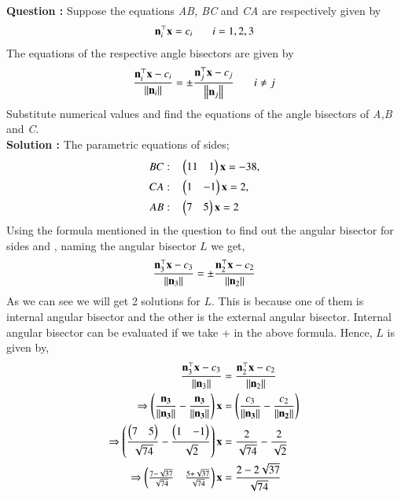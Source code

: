 \documentclass[journal,12pt,twocolumn]{IEEEtran}
\theoremstyle{remark}
\begin{document}
%

\textbf{Question :} Suppose the equations \textit{AB, BC} and \textit{CA} are respectively given by
		\begin{align}
			\vec{n}_{i}^{\top} \vec{x} = c_{i} \hspace{0.25in} i = 1,2,3
		\end{align}
		The equations of the respective angle bisectors are given by
		\begin{align}
			\frac{\vec{n}_{i}^{\top} \vec{x}-c_{i}}{\norm{\vec{n}_{i}}}=\pm\frac{\vec{n}_{j}^{\top} \vec{x}-c_{j}}{\norm{\vec{n}_{j}}} \hspace{0.25in}i\neq j 
		\end{align}
		Substitute numerical values and find the equations of the angle bisectors of \textit{A,B} and \textit{C}.\\
\textbf{Solution :}
	The parametric equations of sides;
	\begin{align}
	BC:\quad &\myvec{11&1}\vec{x}=-38,\\
	CA:\quad &\myvec{1&-1}\vec{x}=2,\\
	AB:\quad &\myvec{7&5}\vec{x}=2\\	  
	\end{align}
	Using the formula mentioned in the question to find out the angular bisector for sides  and , naming the angular bisector $L$ we get,
	\begin{align}
		\frac{\vec{n}_{3}^{\top} \vec{x}-c_{3}}{\norm{\vec{n}_{3}}}=\pm \frac{\vec{n}_{2}^{\top} \vec{x}-c_{2}}{\norm{\vec{n}_{2}}}
	\end{align}
	As we can see we will get 2 solutions for $L$. This is because one of them is internal angular bisector and the other is the external angular bisector. Internal angular bisector can be evaluated if we take + in the above formula.
	Hence, $L$ is given by,
	\begin{align}
		\frac{\vec{n}_{3}^{\top} \vec{x}-c_{3}}{\norm{\vec{n}_{3}}}&=\frac{\vec{n}_{2}^{\top} \vec{x}-c_{2}}{\norm{\vec{n}_{2}}}\\
		\Rightarrow \brak{\frac{\vec{n_{3}}}{\norm{\vec{n_{3}}}}-\frac{\vec{n_{3}}}{\norm{\vec{n_{3}}}}} \vec{x}&=\brak{\frac{c_{3}}{\norm{\vec{n_{3}}}}-\frac{c_{2}}{\norm{\vec{n_{2}}}}}\\
		\Rightarrow \brak{\frac{\myvec{7&5}}{\sqrt{74}}-\frac{\myvec{1&-1}}{\sqrt{2}}} \vec{x}&=\frac{2}{\sqrt{74}}-\frac{2}{\sqrt{2}}\\
		\Rightarrow \myvec{\frac{7-\sqrt{37}}{\sqrt{74}}&\frac{5+\sqrt{37}}{\sqrt{74}}}\vec{x}&=\frac{2-2\sqrt{37}}{\sqrt{74}}
	\end{align}
\end{document}
